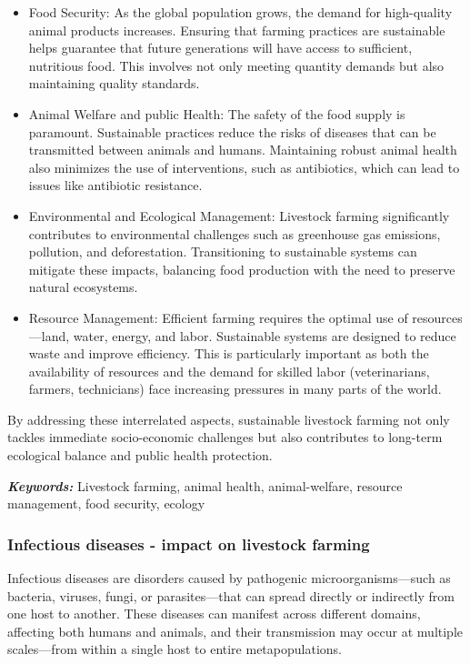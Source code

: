 \begin{itemize}
    \item Food Security: As the global population grows, the demand for high-quality animal products increases. Ensuring that farming practices are sustainable helps guarantee that future generations will have access to sufficient, nutritious food. This involves not only meeting quantity demands but also maintaining quality standards.
    \item Animal Welfare and public Health: The safety of the food supply is paramount. Sustainable practices reduce the risks of diseases that can be transmitted between animals and humans. Maintaining robust animal health also minimizes the use of interventions, such as antibiotics, which can lead to issues like antibiotic resistance.
    \item Environmental and Ecological Management: Livestock farming significantly contributes to environmental challenges such as greenhouse gas emissions, pollution, and deforestation. Transitioning to sustainable systems can mitigate these impacts, balancing food production with the need to preserve natural ecosystems.
    \item Resource Management: Efficient farming requires the optimal use of resources—land, water, energy, and labor. Sustainable systems are designed to reduce waste and improve efficiency. This is particularly important as both the availability of resources and the demand for skilled labor (veterinarians, farmers, technicians) face increasing pressures in many parts of the world.
\end{itemize}

By addressing these interrelated aspects, sustainable livestock farming not only tackles immediate socio-economic challenges but also contributes to long-term ecological balance and public health protection.

\textit{\textbf{Keywords:}} Livestock farming, animal health, animal-welfare, resource management, food security, ecology


\subsubsection{Infectious diseases - impact on livestock farming}

Infectious diseases are disorders caused by pathogenic microorganisms—such as bacteria, viruses, fungi, or parasites—that can spread directly or indirectly from one host to another. These diseases can manifest across different domains, affecting both humans and animals, and their transmission may occur at multiple scales—from within a single host to entire metapopulations.

